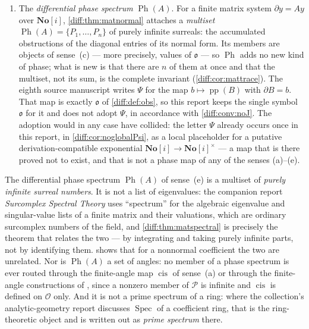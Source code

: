 \documentclass[11pt,letterpaper]{article}
\numberwithin{equation}{section}
\theoremstyle{definition}
\theoremstyle{remark}
\newcommand{\SC}{\mathbf{No}[i]}
\newcommand{\der}{\partial}
\newcommand{\Ofin}{\mathcal O}
\newcommand{\Pcl}{\mathcal P}
\newcommand{\Obs}{\mathfrak o}
\newcommand{\pp}{\operatorname{pp}}
\newcommand{\cis}{\operatorname{cis}}
\newcommand{\Ph}{\operatorname{Ph}}
\begin{document}
\begin{convention}
\begin{enumerate}[label=\textup{(\alph*)},leftmargin=2.4em]
is not a count of angles, residues or accumulated phases.  Wherever this report
writes ``independent phases'' or ``phase generators'', that fourth sense is
meant, and it is never any of (a)--(c).
\item The \emph{differential phase spectrum} $\Ph(A)$. For a finite matrix
system $\der y=Ay$ over $\SC$, \cref{diff:thm:matnormal} attaches a
\emph{multiset} $\Ph(A)=\{P_{1},\dots,P_{n}\}$ of purely infinite surreals: the
accumulated obstructions of the diagonal entries of its normal form. Its
members are objects of sense~(c) --- more precisely, values of $\Obs$ --- so
$\Ph$ adds no new kind of phase; what is new is that there are $n$ of them at
once and that the multiset, not its sum, is the complete invariant
(\cref{diff:cor:mattrace}). The eighth source manuscript writes $\Psi$ for the
map $b\mapsto\pp(B)$ with $\der B=b$. That map is exactly $\Obs$ of
\cref{diff:def:obs}, so this report keeps the single symbol $\Obs$ for it and
does not adopt $\Psi$, in accordance with \cref{diff:conv:noJ}. The adoption
would in any case have collided: the letter $\Psi$ already occurs once in this
report, in \cref{diff:cor:noglobalPsi}, as a local placeholder for a putative
derivation-compatible exponential $\SC\to\SC^{\times}$ --- a map that is there
proved not to exist, and that is not a phase map of any of the senses
(a)--(e).
\end{enumerate}
\end{convention}

\begin{warning}
\label{diff:warn:spectrum}
The differential phase spectrum $\Ph(A)$ of sense~(e) is a multiset of
\emph{purely infinite surreal numbers}. It is not a list of eigenvalues: the
companion report \emph{Surcomplex Spectral Theory} \cite{RepoSpectral} uses
``spectrum'' for the algebraic eigenvalue and singular-value lists of a finite
matrix and their valuations, which are ordinary surcomplex numbers of the
field, and \cref{diff:thm:matspectral} is precisely the theorem that relates
the two --- by integrating and taking purely infinite parts, not by identifying
them.  shows that for a nonnormal coefficient the
two are unrelated. Nor is $\Ph(A)$ a set of angles: no member of a phase
spectrum is ever routed through the finite-angle map $\cis$ of sense~(a) or
through the finite-angle constructions of \cite{RepoTrig}, since a nonzero
member of $\Pcl$ is infinite and $\cis$ is defined on $\Ofin$ only. And it is
not a prime spectrum of a ring: where the collection's analytic-geometry
report discusses $\operatorname{Spec}$ of a coefficient ring, that is the
ring-theoretic object and is written out as \emph{prime spectrum} there.
\end{warning}
\end{document}
